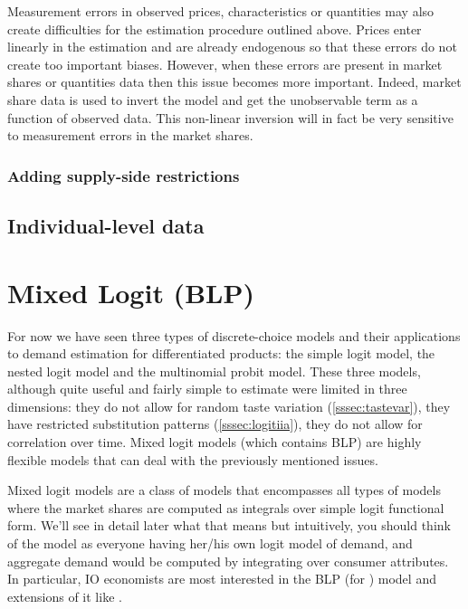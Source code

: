\documentclass[12pt]{report}
\begin{document}
Measurement errors in observed prices, characteristics or quantities may also create difficulties for the estimation procedure outlined above. Prices enter linearly in the estimation and are already endogenous so that these errors do not create too important biases. However, when these errors are present in market shares or quantities data then this issue becomes more important. Indeed, market share data is used to invert the model and get the unobservable term as a function of observed data. This non-linear inversion will in fact be very sensitive to measurement errors in the market shares.

\subsection{Adding supply-side restrictions}



\section{Individual-level data}



\chapter{Mixed Logit (BLP)}

For now we have seen three types of discrete-choice models and their applications to demand estimation for differentiated products: the simple logit model, the nested logit model and the multinomial probit model. These three models, although quite useful and fairly simple to estimate were limited in three dimensions: they do not allow for random taste variation (\ref{sssec:tastevar}), they have restricted substitution patterns (\ref{sssec:logitiia}),  they do not allow for correlation over time. Mixed logit models (which contains BLP) are highly flexible models that can deal with the previously mentioned issues.

Mixed logit models are a class of models that encompasses all types of models where the market shares are computed as integrals over simple logit functional form. We'll see in detail later what that means but intuitively, you should think of the model as everyone having her/his own logit model of demand, and aggregate demand would be computed by integrating over consumer attributes. In particular, IO economists are most interested in the BLP (for \cite{blp_95}) model and extensions of it like \cite{dfs_12}.
\end{document}
